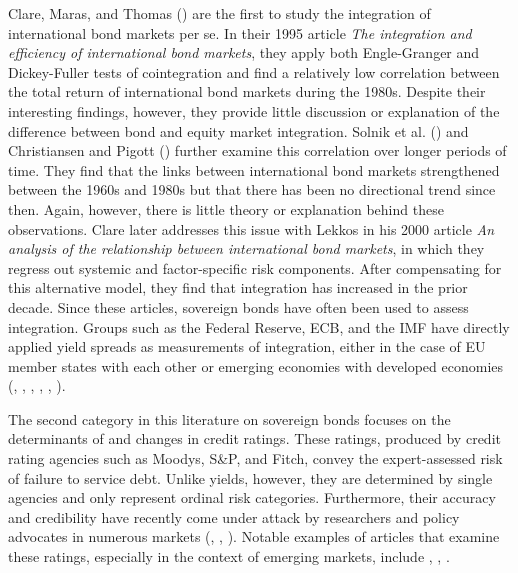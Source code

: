 \documentclass[3p]{elsarticle}
\begin{document}
Clare, Maras, and Thomas (\cite{Clare1995}) are the first to study the integration of international bond markets per se.  In their 1995 article \textit{The integration and efficiency of international bond markets}, they apply both Engle-Granger and Dickey-Fuller tests of cointegration  and find a relatively low correlation between the total return of international bond markets during the 1980s.  Despite their interesting findings, however, they provide little discussion or explanation of the difference between bond and equity market integration.   Solnik et al. (\cite{Solnik1996}) and Christiansen and Pigott (\cite{Christiansen1997}) further examine this correlation over longer periods of time.  They find that the links between international bond markets strengthened between the 1960s and 1980s but that there has been no directional trend since then.  Again, however, there is little theory or explanation behind these observations. Clare later addresses this issue with Lekkos in his 2000 article \textit{An analysis of the relationship between international bond markets}, in which they regress out systemic and factor-specific risk components.  After compensating for this alternative model, they find that integration has increased in the prior decade.  Since these articles, sovereign bonds have often been used to assess integration.  Groups such as the Federal Reserve, ECB, and the IMF have directly applied yield spreads as measurements of integration, either in the case of EU member states with each other or emerging economies with developed economies (\cite{ECB2004}, \cite{ECB2005}, \cite{ECB2007}, \cite{FRBSF2008}, \cite{FRBSF2004}, \cite{Ekinci2007}).

The second category in this literature on sovereign bonds focuses on the determinants of and changes in credit ratings.  These ratings, produced by credit rating agencies such as Moodys, S\&P, and Fitch, convey the expert-assessed risk of failure to service debt.  Unlike yields, however, they are determined by single agencies and only represent ordinal risk categories.  Furthermore, their accuracy and credibility have recently come under attack by researchers and policy advocates in numerous markets (\cite{Hunt2009}, \cite{Frost2006}, \cite{Kuhner2001}).  Notable examples of articles that examine these ratings, especially in the context of emerging markets, include \cite{Cantor1996}, \cite{Durbin1999}, \cite{Biglaiser2007}.  
\end{document}
